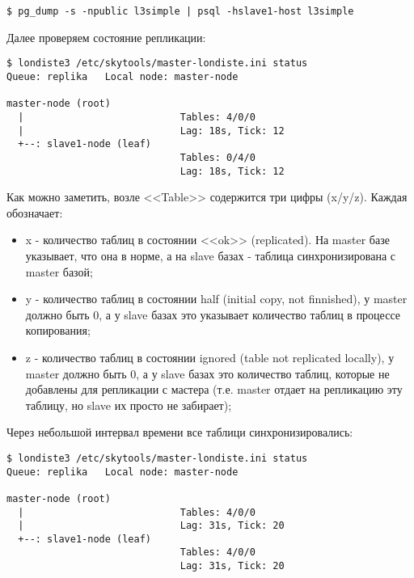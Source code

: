 \begin{lstlisting}[label=lst:londiste-replica-dump1,caption=Клонирование структуры базы]
$ pg_dump -s -npublic l3simple | psql -hslave1-host l3simple
\end{lstlisting}

Далее проверяем состояние репликации:

\begin{lstlisting}[label=lst:londiste-replica15,caption=Статус кластера]
$ londiste3 /etc/skytools/master-londiste.ini status
Queue: replika   Local node: master-node

master-node (root)
  |                           Tables: 4/0/0
  |                           Lag: 18s, Tick: 12
  +--: slave1-node (leaf)
                              Tables: 0/4/0
                              Lag: 18s, Tick: 12
\end{lstlisting}

Как можно заметить, возле <<Table>> содержится три цифры (x/y/z). Каждая обозначает:

\begin{itemize}
  \item x - количество таблиц в состоянии <<ok>> (replicated). На master базе указывает, что она в норме, а на slave базах - таблица синхронизирована с master базой;
  \item y - количество таблиц в состоянии half (initial copy, not finnished), у master должно быть 0, а у slave базах это указывает количество таблиц в процессе копирования;
  \item z - количество таблиц в состоянии ignored (table not replicated locally), у master должно быть 0, а у slave базах это количество таблиц, которые не добавлены для репликации с мастера (т.е. master отдает на репликацию эту таблицу, но slave их просто не забирает);
\end{itemize}

Через небольшой интервал времени все таблици синхронизировались:

\begin{lstlisting}[label=lst:londiste-replica16,caption=Статус кластера]
$ londiste3 /etc/skytools/master-londiste.ini status
Queue: replika   Local node: master-node

master-node (root)
  |                           Tables: 4/0/0
  |                           Lag: 31s, Tick: 20
  +--: slave1-node (leaf)
                              Tables: 4/0/0
                              Lag: 31s, Tick: 20
\end{lstlisting}

